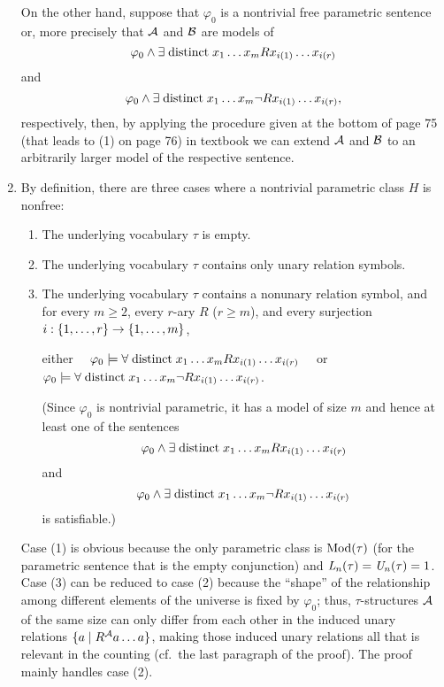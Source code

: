 \begin{enumerate}[1.]
On the other hand, suppose that $\varphi_0$ is a nontrivial free parametric sentence or, more precisely that $\mathcal{A}$ and $\mathcal{B}$ are models of
\[
\varphi_0 \land \exists \mathrel{\mathrm{distinct}} x_1 \ldots x_m Rx_{i(1)} \ldots x_{i(r)}
\]
and
\[
\varphi_0 \land \exists \mathrel{\mathrm{distinct}} x_1 \ldots x_m \neg Rx_{i(1)} \ldots x_{i(r)},
\]
respectively, then, by applying the procedure given at the bottom of page 75 (that leads to (1) on page 76) in textbook we can extend $\mathcal{A}$ and $\mathcal{B}$ to an arbitrarily larger model of the respective sentence.
%
\item {} By definition, there are three cases where a nontrivial parametric class $H$ is nonfree:
\begin{enumerate}[(1)]
\item The underlying vocabulary $\tau$ is empty.
\item The underlying vocabulary $\tau$ contains only unary relation symbols.
\item The underlying vocabulary $\tau$ contains a nonunary relation symbol, and for every $m \geq 2$, every $r$-ary $R$ ($r \geq m$), and every surjection $i : {\{1, \ldots, r\}} \to {\{1, \ldots, m\}}$,
\begin{center}
either \ \ $\varphi_0 \models \forall \mathrel{\mathrm{distinct}} x_1 \ldots x_m Rx_{i(1)} \ldots x_{i(r)}$ \ \ or \ \ $\varphi_0 \models \forall \mathrel{\mathrm{distinct}} x_1 \ldots x_m \neg Rx_{i(1)} \ldots x_{i(r)}$.
\end{center}
(Since $\varphi_0$ is nontrivial parametric, it has a model of size $m$ and hence at least one of the sentences
\[
\varphi_0 \land \exists \mathrel{\mathrm{distinct}} x_1 \ldots x_m Rx_{i(1)} \ldots x_{i(r)}
\]
and
\[
\varphi_0 \land \exists \mathrel{\mathrm{distinct}} x_1 \ldots x_m \neg Rx_{i(1)} \ldots x_{i(r)}
\]
is satisfiable.)
\end{enumerate}
Case (1) is obvious because the only parametric class is $\mathrm{Mod}(\tau)$ (for the parametric sentence that is the empty conjunction) and $\mathit{L}_{n}(\tau) = \mathit{U}_{n}(\tau) = 1$. Case (3) can be reduced to case (2) because the ``shape'' of the relationship among different elements of the universe is fixed by $\varphi_0$; thus, $\tau$-structures $\mathcal{A}$ of the same size can only differ from each other in the induced unary relations ${\{a \mid R^{\mathcal{A}} a \ldots a\}}$, making those induced unary relations all that is relevant in the counting (cf.\ the last paragraph of the proof). The proof mainly handles case (2).


\end{enumerate}
